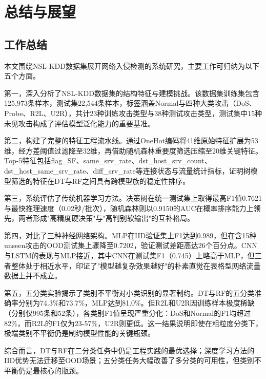 
\section{总结与展望}

\subsection{工作总结}

本文围绕NSL-KDD数据集展开网络入侵检测的系统研究，主要工作可归纳为以下五个方面。

第一，深入分析了NSL-KDD数据集的结构特征与建模挑战。该数据集训练集包含125,973条样本，测试集22,544条样本，标签涵盖Normal与四种大类攻击（DoS、Probe、R2L、U2R），共计23种训练攻击类型与38种测试攻击类型，测试集中15种未见攻击构成了评估模型泛化能力的重要基准。

第二，构建了完整的特征工程流水线。通过OneHot编码将41维原始特征扩展为53维，经方差阈值过滤降至32维，再借助随机森林重要度筛选压缩至20维关键特征。Top-5特征包括flag\_SF、same\_srv\_rate、dst\_host\_srv\_count、dst\_host\_same\_srv\_rate、diff\_srv\_rate等连接状态与流量统计指标，证明树模型筛选的特征在DT与RF之间具有跨模型族的稳定性排序。

第三，系统评估了传统机器学习方法。决策树在统一测试集上取得最高F1值0.7621与最快推理速度（0.02秒/批次），随机森林则以0.9150的AUC在概率排序能力上领先，两者形成"高精度硬决策"与"高判别软输出"的互补格局。

第四，对比了三种神经网络架构。MLP在IID验证集上F1达到0.989，但在含15种unseen攻击的OOD测试集上骤降至0.7202，验证测试差距高达26个百分点。CNN与LSTM的表现与MLP接近，其中CNN在测试集F1（0.745）上略高于MLP，但三者整体处于相近水平，印证了"模型越复杂效果越好"的朴素直觉在表格型网络流量数据上并不成立。

第五，五分类实验揭示了类别不平衡对小类识别的显著制约。DT与RF的五分类准确率分别为74.3\%和73.7\%，MLP达到81.0\%。但R2L和U2R因训练样本极度稀缺（分别仅995条和52条），各类别F1值呈现严重分化：DoS和Normal的F1均超过82\%，而R2L的F1仅为23-57\%，U2R则更低。这一结果说明即使在粗粒度分类下，极端类别不平衡仍是制约模型性能的关键瓶颈。

综合而言，DT与RF在二分类任务中仍是工程实践的最优选择；深度学习方法的IID优势无法迁移至OOD场景；五分类任务大幅改善了多分类的可用性，但类别不平衡仍是最核心的瓶颈。

